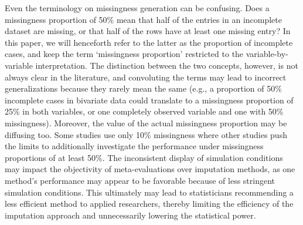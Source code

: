 \documentclass[bimj,fleqn]{w-art}
\begin{document}
Even the terminology on missingness generation can be confusing. Does a missingness proportion of 50\% mean that half of the entries in an incomplete dataset are missing, or that half of the rows have at least one missing entry? In this paper, we will henceforth refer to the latter as the proportion of incomplete cases, and keep the term `missingness proportion' restricted to the variable-by-variable interpretation. The distinction between the two concepts, however, is not always clear in the literature, and convoluting the terms may lead to incorrect generalizations because they rarely mean the same (e.g., a proportion of 50\% incomplete cases in bivariate data could translate to a missingness proportion of 25\% in both variables, or one completely observed variable and one with 50\% missingness). Moreover, the value of the actual missingness proportion may be diffusing too. Some studies use only 10\% missingness where other studies push the limits to additionally investigate the performance under missingness proportions of at least 50\%. The inconsistent display of simulation conditions may impact the objectivity of meta-evaluations over imputation methods, as one method's performance may appear to be favorable because of less stringent simulation conditions. This ultimately may lead to statisticians recommending a less efficient method to applied researchers, thereby limiting the efficiency of the imputation approach and unnecessarily lowering the statistical power.

\end{document}

